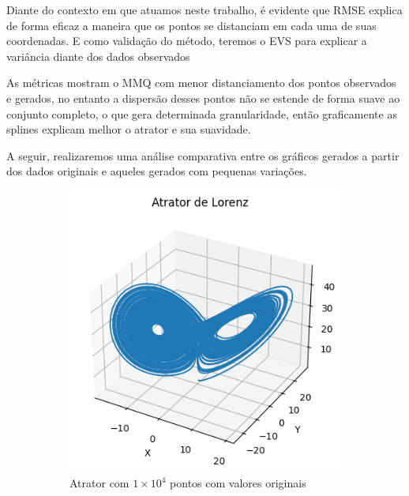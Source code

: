 \documentclass[12pt, a4paper]{article}
\begin{document}
    Diante do contexto em que atuamos neste trabalho, é evidente que RMSE explica de forma eficaz a maneira que os pontos se distanciam em cada uma de suas coordenadas. E como validação do método, teremos o EVS para explicar a variância diante dos dados observados
    
    As  métricas mostram o MMQ com menor distanciamento dos pontos observados e gerados, no entanto a dispersão desses pontos não se estende de forma suave ao conjunto completo, o que gera determinada granularidade, então graficamente as splines explicam melhor o atrator e sua suavidade.
    
    A seguir, realizaremos uma análise comparativa entre os gráficos gerados a
    partir dos dados originais e aqueles gerados com pequenas variações.
    
    \begin{figure}[H]
        \centering
        \begin{subfigure}{0.45\textwidth}
            \centering
            \includegraphics[width=\textwidth]{img/attrator10000.png}
            \caption{Atrator com $1 \times 10^4$ pontos com valores originais}
            \label{fig:imagemfgh1}
        \end{subfigure}
        \hfill
        \begin{subfigure}{0.45\textwidth}

\end{subfigure}
\end{figure}
\end{document}
